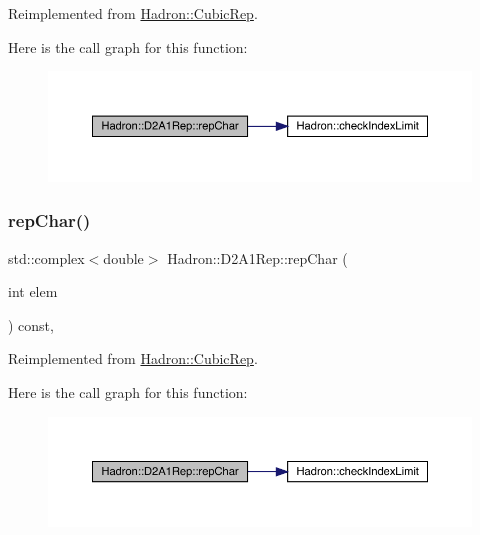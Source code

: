 Reimplemented from \mbox{\hyperlink{structHadron_1_1CubicRep_af45227106e8e715e84b0af69cd3b36f8}{Hadron\+::\+Cubic\+Rep}}.

Here is the call graph for this function\+:
\nopagebreak
\begin{figure}[H]
\begin{center}
\leavevmode
\includegraphics[width=350pt]{d5/d28/structHadron_1_1D2A1Rep_a6c72d27c96ff1d69632ebb7732955c54_cgraph}
\end{center}
\end{figure}
\mbox{\label{structHadron_1_1D2A1Rep_a6c72d27c96ff1d69632ebb7732955c54}} 
\subsubsection{\texorpdfstring{repChar()}{repChar()}\hspace{0.1cm}{\footnotesize\ttfamily [3/3]}}
{\footnotesize\ttfamily std\+::complex$<$double$>$ Hadron\+::\+D2\+A1\+Rep\+::rep\+Char (\begin{DoxyParamCaption}\item[{int}]{elem }\end{DoxyParamCaption}) const\hspace{0.3cm}{\ttfamily [inline]}, {\ttfamily [virtual]}}



Reimplemented from \mbox{\hyperlink{structHadron_1_1CubicRep_af45227106e8e715e84b0af69cd3b36f8}{Hadron\+::\+Cubic\+Rep}}.

Here is the call graph for this function\+:
\nopagebreak
\begin{figure}[H]
\begin{center}
\leavevmode
\includegraphics[width=350pt]{d5/d28/structHadron_1_1D2A1Rep_a6c72d27c96ff1d69632ebb7732955c54_cgraph}
\end{center}
\end{figure}
\mbox{\label{structHadron_1_1D2A1Rep_a0d9bec731ada6fec10956dce667b2ffd}} 
